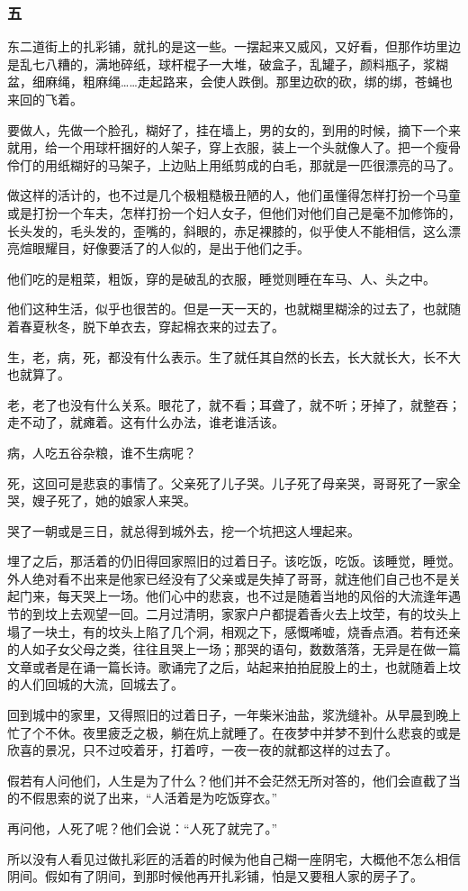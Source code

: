 \subsubsection*{五}
\par 东二道街上的扎彩铺，就扎的是这一些。一摆起来又威风，又好看，但那作坊里边是乱七八糟的，满地碎纸，球杆棍子一大堆，破盒子，乱罐子，颜料瓶子，浆糊盆，细麻绳，粗麻绳……走起路来，会使人跌倒。那里边砍的砍，绑的绑，苍蝇也来回的飞着。
\par 要做人，先做一个脸孔，糊好了，挂在墙上，男的女的，到用的时候，摘下一个来就用，给一个用球杆捆好的人架子，穿上衣服，装上一个头就像人了。把一个瘦骨伶仃的用纸糊好的马架子，上边贴上用纸剪成的白毛，那就是一匹很漂亮的马了。
\par 做这样的活计的，也不过是几个极粗糙极丑陋的人，他们虽懂得怎样打扮一个马童或是打扮一个车夫，怎样打扮一个妇人女子，但他们对他们自己是毫不加修饰的，长头发的，毛头发的，歪嘴的，斜眼的，赤足裸膝的，似乎使人不能相信，这么漂亮煊眼耀目，好像要活了的人似的，是出于他们之手。
\par 他们吃的是粗菜，粗饭，穿的是破乱的衣服，睡觉则睡在车马、人、头之中。
\par 他们这种生活，似乎也很苦的。但是一天一天的，也就糊里糊涂的过去了，也就随着春夏秋冬，脱下单衣去，穿起棉衣来的过去了。
\par 生，老，病，死，都没有什么表示。生了就任其自然的长去，长大就长大，长不大也就算了。
\par 老，老了也没有什么关系。眼花了，就不看；耳聋了，就不听；牙掉了，就整吞；走不动了，就瘫着。这有什么办法，谁老谁活该。
\par 病，人吃五谷杂粮，谁不生病呢？
\par 死，这回可是悲哀的事情了。父亲死了儿子哭。儿子死了母亲哭，哥哥死了一家全哭，嫂子死了，她的娘家人来哭。
\par 哭了一朝或是三日，就总得到城外去，挖一个坑把这人埋起来。
\par 埋了之后，那活着的仍旧得回家照旧的过着日子。该吃饭，吃饭。该睡觉，睡觉。外人绝对看不出来是他家已经没有了父亲或是失掉了哥哥，就连他们自己也不是关起门来，每天哭上一场。他们心中的悲哀，也不过是随着当地的风俗的大流逢年遇节的到坟上去观望一回。二月过清明，家家户户都提着香火去上坟茔，有的坟头上塌了一块土，有的坟头上陷了几个洞，相观之下，感慨唏嘘，烧香点酒。若有还亲的人如子女父母之类，往往且哭上一场；那哭的语句，数数落落，无异是在做一篇文章或者是在诵一篇长诗。歌诵完了之后，站起来拍拍屁股上的土，也就随着上坟的人们回城的大流，回城去了。
\par 回到城中的家里，又得照旧的过着日子，一年柴米油盐，浆洗缝补。从早晨到晚上忙了个不休。夜里疲乏之极，躺在炕上就睡了。在夜梦中并梦不到什么悲哀的或是欣喜的景况，只不过咬着牙，打着哼，一夜一夜的就都这样的过去了。
\par 假若有人问他们，人生是为了什么？他们并不会茫然无所对答的，他们会直截了当的不假思索的说了出来，“人活着是为吃饭穿衣。”
\par 再问他，人死了呢？他们会说：“人死了就完了。”
\par 所以没有人看见过做扎彩匠的活着的时候为他自己糊一座阴宅，大概他不怎么相信阴间。假如有了阴间，到那时候他再开扎彩铺，怕是又要租人家的房子了。
